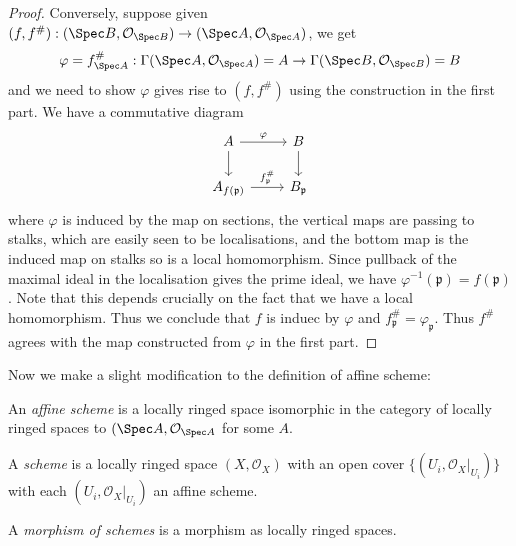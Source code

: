 \documentclass[a4paper]{article}
\newcommand{\sh}[1]{\mathcal{#1}} %
\begin{document}
\begin{proof}
  Conversely, suppose given \((f, f^\#): (\Spec B, \sh O_{\Spec B}) \to (\Spec A, \sh O_{\Spec A})\), we get
  \[
    \varphi = f_{\Spec A}^\#: \Gamma(\Spec A, \sh O_{\Spec A}) = A \to \Gamma(\Spec B, \sh O_{\Spec B}) = B
  \]
  and we need to show \(\varphi\) gives rise to \((f, f^\#)\) using the construction in the first part. We have a commutative diagram
  \[
    \begin{tikzcd}
      A \ar[r, "\varphi"] \ar[d] & B \ar[d] \\
      A_{f(\mathfrak p)} \ar[r, "f_{\mathfrak p}^\#"] & B_{\mathfrak p}
    \end{tikzcd}
  \]
  where \(\varphi\) is induced by the map on sections, the vertical maps are passing to stalks, which are easily seen to be localisations, and the bottom map is the induced map on stalks so is a local homomorphism. Since pullback of the maximal ideal in the localisation gives the prime ideal, we have \(\varphi^{-1}(\mathfrak p) = f(\mathfrak p)\). Note that this depends crucially on the fact that we have a local homomorphism. Thus we conclude that \(f\) is induec by \(\varphi\) and \(f_{\mathfrak p}^\# = \varphi_{\mathfrak p}\). Thus \(f^\#\) agrees with the map constructed from \(\varphi\) in the first part.
\end{proof}

Now we make a slight modification to the definition of affine scheme:
\begin{definition}
  An \emph{affine scheme} is a locally ringed space isomorphic in the category of locally ringed spaces to \((\Spec A, \sh O_{\Spec A}\) for some \(A\).
\end{definition}

\begin{definition}[scheme]
  A \emph{scheme} is a locally ringed space \((X, \sh O_X)\) with an open cover \(\{(U_i, \sh O_X|_{U_i})\}\) with each \((U_i, \sh O_X|_{U_i})\) an affine scheme.

  A \emph{morphism of schemes} is a morphism as locally ringed spaces.
\end{definition}
\end{document}
